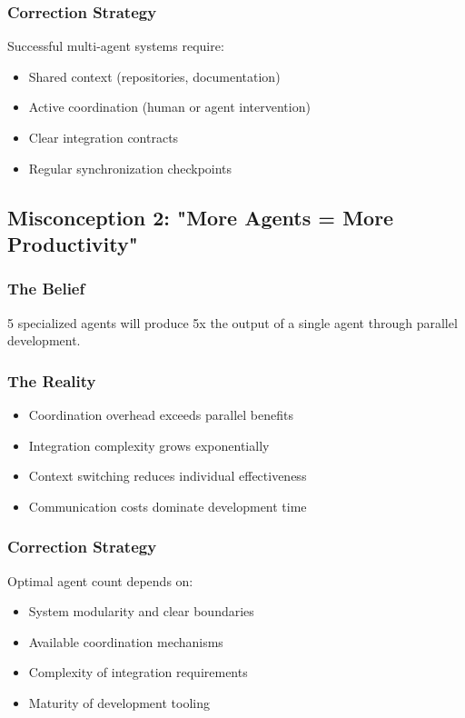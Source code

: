 \documentclass[11pt]{article}
\begin{document}
\subsubsection{Correction Strategy}
\label{sec:orgff39deb}
Successful multi-agent systems require:
\begin{itemize}
\item Shared context (repositories, documentation)
\item Active coordination (human or agent intervention)
\item Clear integration contracts
\item Regular synchronization checkpoints
\end{itemize}
\subsection{Misconception 2: "More Agents = More Productivity"}
\label{sec:org7a586fa}
\subsubsection{The Belief}
\label{sec:orgb1f4de4}
5 specialized agents will produce 5x the output of a single agent through parallel development.
\subsubsection{The Reality}
\label{sec:orga8bade0}
\begin{itemize}
\item Coordination overhead exceeds parallel benefits
\item Integration complexity grows exponentially
\item Context switching reduces individual effectiveness
\item Communication costs dominate development time
\end{itemize}
\subsubsection{Correction Strategy}
\label{sec:orgd0f093e}
Optimal agent count depends on:
\begin{itemize}
\item System modularity and clear boundaries
\item Available coordination mechanisms
\item Complexity of integration requirements
\item Maturity of development tooling
\end{itemize}
\end{document}
